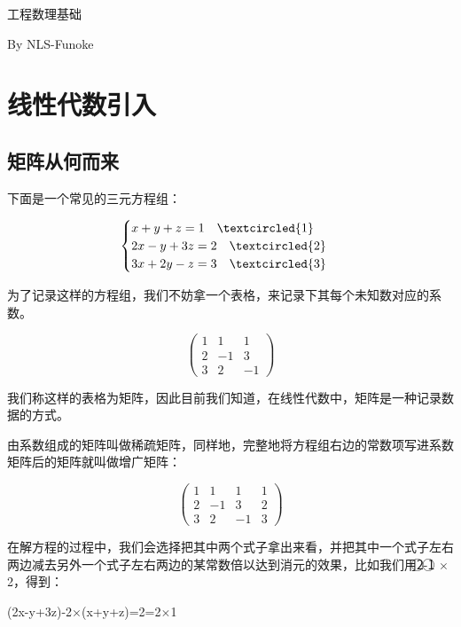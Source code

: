 \documentclass[12.8pt,a4paper,numbering = AMSalpha]{book}
\begin{document}
\quad
\vspace{280pt}
\begin{center}
	{\zhhei\fontsize{30pt}{40pt} 工程数理基础}
\end{center}
\vspace{20pt}
\begin{center}
	{\zhhei\centering By NLS-Funoke}
\end{center}
\newpage
\tableofcontents
\newpage

\section{线性代数引入}
\subsection{矩阵从何而来}

下面是一个常见的三元方程组：

\[
\begin{cases}
	x + y + z = 1    \quad\textcircled{1}\\
	2x - y + 3z = 2  \quad\textcircled{2}\\
	3x + 2y - z = 3  \quad\textcircled{3}
\end{cases}
\]

为了记录这样的方程组，我们不妨拿一个表格，来记录下其每个未知数对应的系数。

\[
\begin{pmatrix}
	1 & 1 & 1 \\
	2 & -1 & 3 \\
	3 & 2 & -1 
\end{pmatrix}
\]

我们称这样的表格为矩阵，因此目前我们知道，在线性代数中，矩阵是一种记录数据的方式。

由系数组成的矩阵叫做稀疏矩阵，同样地，完整地将方程组右边的常数项写进系数矩阵后的矩阵就叫做增广矩阵：

\[
\begin{pmatrix}
	1 & 1 & 1 & 1\\
	2 & -1 & 3 & 2\\
	3 & 2 & -1 & 3
\end{pmatrix}
\]

在解方程的过程中，我们会选择把其中两个式子拿出来看，并把其中一个式子左右两边减去另外一个式子左右两边的某常数倍以达到消元的效果，比如我们用\textcircled{2}-\textcircled{1} $\times$ 2，得到：

\begin{center}
	\centering (2x-y+3z)-2$\times$(x+y+z)=2=2$\times$1
\end{center}
\end{document}
